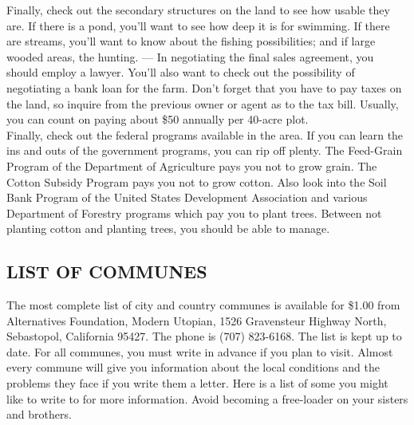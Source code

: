 \documentclass[11pt,twoside,a4paper]{book}
\begin{document}
Finally, check out the secondary structures on the land to see how usable they are. If there is a pond, you'll want to see how deep it is for swimming. If there are streams, you'll want to know about the fishing possibilities; and if large wooded areas, the hunting. --- In negotiating the final sales agreement, you should employ a lawyer. You'll also want to check out the possibility of negotiating a bank loan for the farm. Don't forget that you have to pay taxes on the land, so inquire from the previous owner or agent as to the tax bill. Usually, you can count on paying about \$50 annually per 40-acre plot.~\\

Finally, check out the federal programs available in the area. If you can learn the ins and outs of the government programs, you can rip off plenty. The Feed-Grain Program of the Department of Agriculture pays you not to grow grain. The Cotton Subsidy Program pays you not to grow cotton. Also look into the Soil Bank Program of the United States Development Association and various Department of Forestry programs which pay you to plant trees. Between not planting cotton and planting trees, you should be able to manage.

\subsection{LIST OF COMMUNES}

The most complete list of city and country communes is available for \$1.00 from Alternatives Foundation, Modern Utopian, 1526 Gravensteur Highway North, Sebastopol, California 95427. The phone is (707) 823-6168. The list is kept up to date. For all communes, you must write in advance if you plan to visit. Almost every commune will give you information about the local conditions and the problems they face if you write them a letter. Here is a list of some you might like to write to for more information. Avoid becoming a free-loader on your sisters and brothers. 
\end{document}
